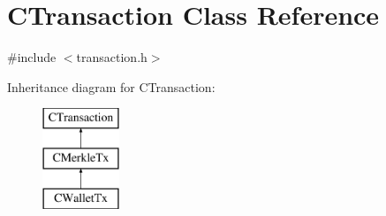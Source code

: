 \hypertarget{class_c_transaction}{}\section{C\+Transaction Class Reference}
\label{class_c_transaction}


{\ttfamily \#include $<$transaction.\+h$>$}

Inheritance diagram for C\+Transaction\+:\begin{figure}[H]
\begin{center}
\leavevmode
\includegraphics[height=3.000000cm]{class_c_transaction}
\end{center}
\end{figure}
